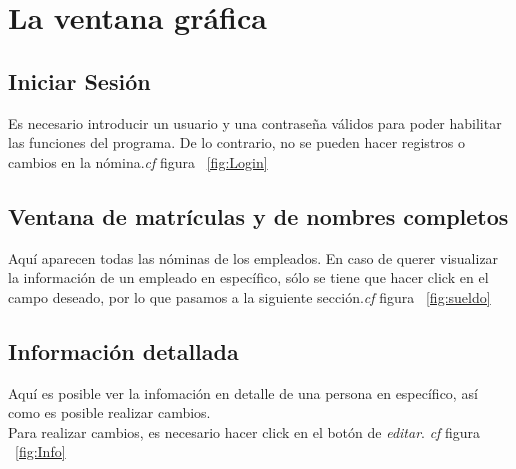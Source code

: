 \documentclass[12pt]{amsart}
\begin{document}
\section{La ventana gr\'afica}
\subsection{Iniciar Sesi\'on}
{Es necesario introducir un usuario y una contrase\~na v\'alidos para poder habilitar las funciones del programa. De lo contrario, no se pueden hacer registros o cambios en la n\'omina.\textit{cf} figura ~\ref{fig:Login}}

\subsection{Ventana de matr\'iculas y de nombres completos}
{Aqu\'i aparecen todas las n\'ominas de los empleados. En caso de querer visualizar la informaci\'on de un empleado en espec\'ifico, s\'olo se tiene que hacer click en el campo deseado, por lo que pasamos a la siguiente secci\'on.\textit{cf} figura ~\ref{fig:sueldo}}

\subsection{Informaci\'on detallada}
{Aqu\'i es posible ver la infomaci\'on en detalle de una persona en espec\'ifico, as\'i como es posible realizar cambios.}\\
{Para realizar cambios, es necesario hacer click en el bot\'on de \textit{editar}. \textit{cf} figura ~\ref{fig:Info} }\\\\\\\\\\\\\\\\\\\\\\
\end{document}
